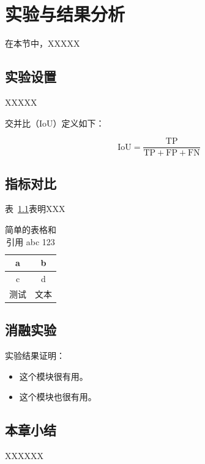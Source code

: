 \chapter{实验与结果分析}
在本节中，XXXXX

\section{实验设置}

XXXXX

交并比（IoU）定义如下：

\begin{equation}
\text{IoU} = \frac{\text{TP}}{\text{TP} + \text{FP} + \text{FN}}
\end{equation}


\section{指标对比}
表~\ref{table:simple}表明XXX
\begin{table}[ht]
  \centering
  \caption{%
    简单的表格和引用 abc 123 %
  }
  \label{table:simple}
  \begin{tabular}{cc}
    \toprule     %
    a & b \\      %
    \midrule     %
    c & d \\
    测试 & 文本 \\
    \bottomrule  %
  \end{tabular}
\end{table}


\section{消融实验}

实验结果证明：

\begin{itemize}
\item 这个模块很有用。
\item 这个模块也很有用。
\end{itemize}


\section{本章小结}
XXXXXX